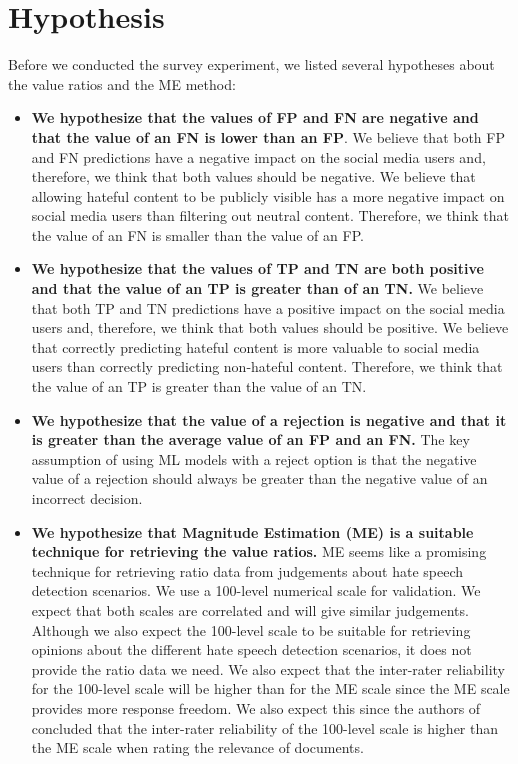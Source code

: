 \section{Hypothesis}
\label{sec:survey-hypothesis}
Before we conducted the survey experiment, we listed several hypotheses about the value ratios and the ME method:
\begin{itemize}
    \item \textbf{We hypothesize that the values of FP and FN are negative and that the value of an FN is lower than an FP}. We believe that both FP and FN predictions have a negative impact on the social media users and, therefore, we think that both values should be negative. We believe that allowing hateful content to be publicly visible has a more negative impact on social media users than filtering out neutral content. Therefore, we think that the value of an FN is smaller than the value of an FP.
    \item \textbf{We hypothesize that the values of TP and TN are both positive and that the value of an TP is greater than of an TN.} We believe that both TP and TN predictions have a positive impact on the social media users and, therefore, we think that both values should be positive. We believe that correctly predicting hateful content is more valuable to social media users than correctly predicting non-hateful content. Therefore, we think that the value of an TP is greater than the value of an TN.
    \item \textbf{We hypothesize that the value of a rejection is negative and that it is greater than the average value of an FP and an FN.} The key assumption of using ML models with a reject option is that the negative value of a rejection should always be greater than the negative value of an incorrect decision.
    \item \textbf{We hypothesize that Magnitude Estimation (ME) is a suitable technique for retrieving the value ratios.} ME seems like a promising technique for retrieving ratio data from judgements about hate speech detection scenarios. We use a 100-level numerical scale for validation. We expect that both scales are correlated and will give similar judgements. Although we also expect the 100-level scale to be suitable for retrieving opinions about the different hate speech detection scenarios, it does not provide the ratio data we need. We also expect that the inter-rater reliability for the 100-level scale will be higher than for the ME scale since the ME scale provides more response freedom. We also expect this since the authors of \citet{roitero2018fine} concluded that the inter-rater reliability of the 100-level scale is higher than the ME scale when rating the relevance of documents.
\end{itemize}

